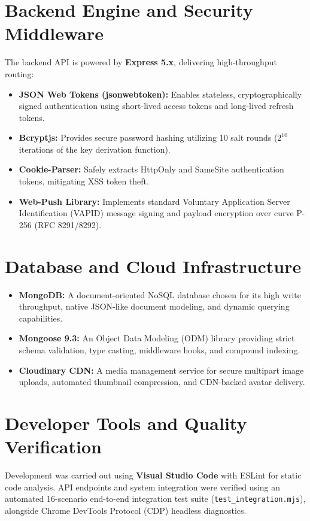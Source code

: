 \section{Backend Engine and Security Middleware}

The backend API is powered by \textbf{Express 5.x}, delivering high-throughput routing:
\begin{itemize}
  \item \textbf{JSON Web Tokens (jsonwebtoken):} Enables stateless, cryptographically signed authentication using short-lived access tokens and long-lived refresh tokens.
  \item \textbf{Bcryptjs:} Provides secure password hashing utilizing 10 salt rounds ($2^{10}$ iterations of the key derivation function).
  \item \textbf{Cookie-Parser:} Safely extracts HttpOnly and SameSite authentication tokens, mitigating XSS token theft.
  \item \textbf{Web-Push Library:} Implements standard Voluntary Application Server Identification (VAPID) message signing and payload encryption over curve P-256 (RFC 8291/8292).
\end{itemize}

\section{Database and Cloud Infrastructure}

\begin{itemize}
  \item \textbf{MongoDB:} A document-oriented NoSQL database chosen for its high write throughput, native JSON-like document modeling, and dynamic querying capabilities.
  \item \textbf{Mongoose 9.3:} An Object Data Modeling (ODM) library providing strict schema validation, type casting, middleware hooks, and compound indexing.
  \item \textbf{Cloudinary CDN:} A media management service for secure multipart image uploads, automated thumbnail compression, and CDN-backed avatar delivery.
\end{itemize}

\section{Developer Tools and Quality Verification}

Development was carried out using \textbf{Visual Studio Code} with ESLint for static code analysis. API endpoints and system integration were verified using an automated 16-scenario end-to-end integration test suite (\texttt{test\_integration.mjs}), alongside Chrome DevTools Protocol (CDP) headless diagnostics.

